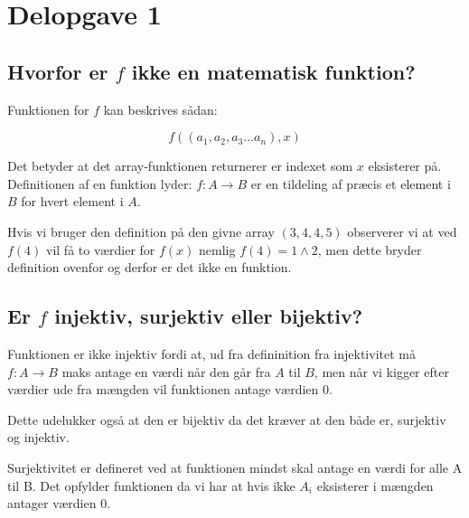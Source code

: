 \section{Delopgave 1}\label{sec:delopgave-12}

\subsection{Hvorfor er \(f\) ikke en matematisk funktion?}\label{subsec:hvorfor-er-(f)-ikke-en-matematisk-funktion?}

Funktionen for \(f\) kan beskrives sådan:

\begin{equation}
    f((a_{1}, a_{2}, a_{3} \dots a_{n}), x)
    \label{eq:equation12}
\end{equation}

Det betyder at det array-funktionen returnerer er indexet som \(x\) eksisterer på.
Definitionen af en funktion lyder: \(f: A \rightarrow B\) er en tildeling af præcis et element i \(B\) for hvert element
i \(A\).

Hvis vi bruger den definition på den givne array \(\left(3, 4, 4, 5\right)\) observerer vi at ved \(f(4)\) vil få to
værdier for \(f(x)\) nemlig \(f(4) = 1 \wedge 2\), men dette bryder definition ovenfor og derfor er det ikke en
funktion.

\subsection{Er \(f\) injektiv, surjektiv eller bijektiv?}\label{subsec:er-(f)-injektiv-surjektiv-eller-bijektiv?}

Funktionen er ikke injektiv fordi at, ud fra defininition fra injektivitet må \( f: A \rightarrow B \) maks antage en
værdi når den går fra \(A\) til \(B\), men når vi kigger efter værdier ude fra mængden vil funktionen antage værdien
\(0\).

Dette udelukker også at den er bijektiv da det kræver at den både er, surjektiv og injektiv.

Surjektivitet er defineret ved at funktionen mindst skal antage en værdi for alle A til B\@.
Det opfylder funktionen da vi har at hvis ikke \(A_{i}\) eksisterer i mængden antager værdien \(0\).
